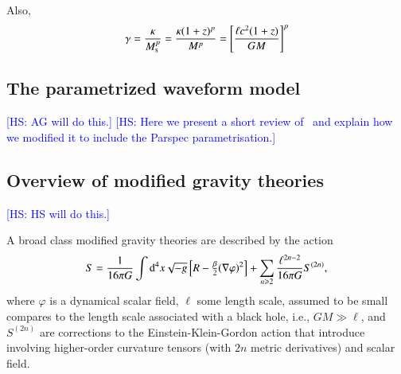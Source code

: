 \documentclass[twocolumn,prd,aps,superscriptaddress,preprintnumbers,tightenlines,showpacs,nofootinbib,eqsecnum,amsfonts,amsmath,longbibliography]{revtex4-2}
\newcommand{\dd}{{\rm d}}
\newcommand{\hs}[1]{{\textcolor{blue}{{[HS: #1]}} }}
\begin{document}
Also,
%
\begin{equation}
\gamma = \frac{\kappa}{M_{\rm s}^{p}} = \frac{\kappa (1 + z)^{p}}{M^{p}}
= \left[
\frac{\ell c^2 (1 + z)}{G M}
\right]^{p}
\end{equation}
%

\subsection{The parametrized waveform model}
\label{sec:review_pSEOB}

\hs{AG will do this.}
\hs{Here we present a short review of~\cite{Brito:2018rfr,Ghosh:2021mrv} and
explain how we modified it to include the {\sc Parspec} parametrisation.}

\subsection{Overview of modified gravity theories}
\label{sec:review_theories}

\hs{HS will do this.}


A broad class modified gravity theories are described by the action
%
\begin{equation}
S = \frac{1}{16 \pi G} \int \dd^4x \sqrt{-g}
\left[ R
- \tfrac{\beta}{2}(\nabla \varphi)^2
\right]
+
\sum_{n \geqslant 2} \frac{\ell^{2n - 2}}{16 \pi G} S^{(2n)},
\end{equation}
%
where $\varphi$ is a dynamical scalar field, $\ell$ some length scale, assumed
to be small compares to the length scale associated with a black hole, i.e.,
$GM \gg \ell$, and $S^{(2n)}$ are corrections to the Einstein-Klein-Gordon
action that introduce involving higher-order curvature tensors (with $2n$
metric derivatives) and scalar field.
\end{document}
